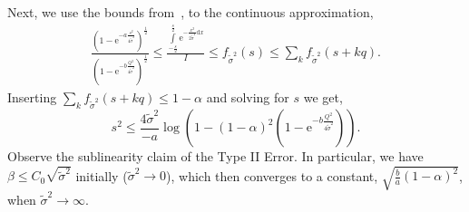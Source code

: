 \documentclass[journal, twoside, web]{ieeecolorpreprint}
\begin{document}
    Next, we use the bounds from~\cite{Chu1955}, to the continuous approximation,
    \begin{align*}
        \frac{(1-\mathrm{e}^{-a\frac{s^2}{4\tilde \sigma^2}})^{\frac{1}{2}}}{(1-\mathrm{e}^{-b\frac{Q^2}{4\tilde \sigma^2}})^{\frac{1}{2}}} \leq \frac{\int \limits_{-\frac{s}{2}}^{\frac{s}{2}} \mathrm{e}^{-\frac{x^2}{2\tilde \sigma^2} \mathrm{d}x}}{I} \leq f_{\tilde \sigma^2}(s) \leq \sum \limits_{k} f_{\tilde \sigma^2}(s+kq). %
    \end{align*}
    Inserting $\sum \limits_{k} f_{\tilde \sigma^2}(s+kq) \leq 1-\alpha$ and solving for $s$ we get,
    \begin{equation*}
         s^2 \leq {\frac{4\tilde \sigma^2}{-a}\log \left( 1- (1-\alpha)^2 \left (1-\mathrm{e}^{-b\frac{Q^2}{4\tilde \sigma^2}}\right )\right)}.
    \end{equation*}
    Observe the sublinearity claim of the Type II Error. In particular, we have $\beta \leq C_0 \sqrt{\tilde \sigma^2}$ initially ($\tilde \sigma^2 \to 0$), which then converges to a constant, $\sqrt{\frac{b}{a}(1-\alpha)^2}$, when $\tilde \sigma^2 \to \infty$.







\end{document}
